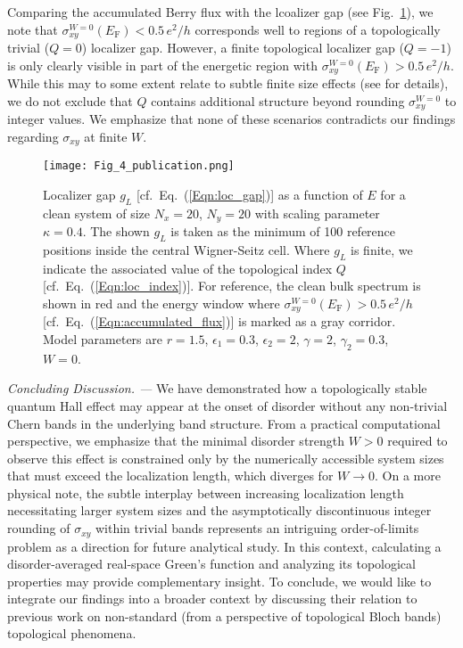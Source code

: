 \documentclass[aps,prl,amsmath,amssymb,twocolumn, superscriptaddress]{revtex4-2}
\newcommand{\BM}[1]{{\color{orange} #1}}
\newcommand{\eq}[1]{Eq.~(\ref{#1})}
\begin{document}
Comparing the accumulated Berry flux with the lcoalizer gap (see Fig.~\ref{Fig:spec_loc}), we note that $\sigma_{xy}^{W=0}(E_\mathrm{F})<0.5\, e^2 / h$ corresponds well to regions of a topologically trivial ($Q=0$) localizer gap. However, a finite topological localizer gap ($Q= -1$) is only clearly visible in part of the energetic region with $\sigma_{xy}^{W=0}(E_\mathrm{F}) > 0.5\, e^2 / h$. While this may to some extent relate to subtle finite size effects (see \cite{Supplemental} for details), we do not exclude that $Q$ contains additional structure beyond rounding $\sigma_{xy}^{W=0}$ to integer values. We emphasize that none of these scenarios contradicts our findings regarding $\sigma_{xy}$ at finite $W$.  

\begin{figure}[htp!]	 
{\texttt{[image: Fig\_4\_publication.png]}}
\caption{Localizer gap $g_L$ [cf.~\eq{Eqn:loc_gap}] as a function of $E$ \BM{for} a clean system of size $N_x = 20$, $N_y = 20$ with scaling parameter $\kappa = 0.4$. The shown $g_L$ is taken as the minimum of 100 reference positions inside the central Wigner-Seitz cell. Where $g_L$ is finite, we indicate the associated value of the topological index $Q$ [cf.~\eq{Eqn:loc_index}]. For reference, the clean bulk spectrum is shown in red and the energy window where $\sigma_{xy}^{W=0}(E_\mathrm{F})  > 0.5 \,e^2 / h$ [cf.~\eq{Eqn:accumulated_flux}] is marked as a gray corridor. Model parameters are $r = 1.5$, $\epsilon_1 = 0.3$, $\epsilon_2 = 2$, $\gamma  =2$, $\gamma_2 = 0.3$, $W = 0$.}\label{Fig:spec_loc}
\end{figure}

{\it Concluding Discussion. ---} 
We have demonstrated how a topologically stable quantum Hall effect may appear at the onset of disorder without any non-trivial Chern bands in the underlying band structure. From a practical computational perspective, we emphasize that the minimal disorder strength $W > 0$ required to observe this effect is constrained only by the numerically accessible system sizes that must exceed the localization length, which diverges for $W \rightarrow 0$. On a more physical note, the subtle interplay between increasing localization length necessitating larger system sizes and the asymptotically discontinuous integer rounding of $\sigma_{xy}$ within trivial bands represents an intriguing order-of-limits problem as a direction for future analytical study. \BM{In this context, calculating a disorder-averaged real-space Green’s function \cite{RS_GF_1, RS_GF_2} and analyzing its topological properties \cite{GF_topology_2} may provide complementary insight.} To conclude, we would like to integrate our findings into a broader context by discussing their relation to previous work on non-standard (from a perspective of topological Bloch bands) topological phenomena.
\end{document}
